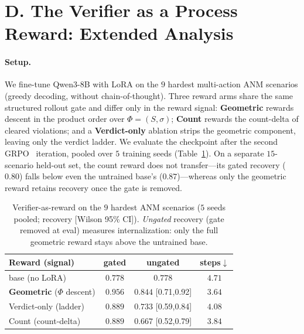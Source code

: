 \documentclass[letterpaper]{article} %
\begin{document}
\section{D. The Verifier as a Process Reward: Extended Analysis}
\label{supp:reward}

\paragraph{Setup.}
We fine-tune Qwen3-8B with LoRA on the $9$ hardest multi-action ANM scenarios (greedy decoding, without chain-of-thought). Three reward arms share the same structured rollout gate and differ only in the reward signal: \textbf{Geometric} rewards descent in the product order over $\Phi=(S,\sigma)$; \textbf{Count} rewards the count-delta of cleared violations; and a \textbf{Verdict-only} ablation strips the geometric component, leaving only the verdict ladder. We evaluate the checkpoint after the second GRPO~\citep{deepseekmath2024grpo,lightman2024prm} iteration, pooled over $5$ training seeds (Table~\ref{tab:reward}). On a separate $15$-scenario held-out set, the count reward does not transfer---its gated recovery ($0.80$) falls below even the untrained base's ($0.87$)---whereas only the geometric reward retains recovery once the gate is removed.

\begin{table}[t]
\centering
\caption{Verifier-as-reward on the $9$ hardest ANM scenarios ($5$ seeds pooled; recovery [Wilson 95\% CI]). \emph{Ungated} recovery (gate removed at eval) measures internalization: only the full geometric reward stays above the untrained base.}
\label{tab:reward}
\footnotesize
\setlength{\tabcolsep}{5pt}
\begin{tabular*}{\columnwidth}{@{\extracolsep{\fill}}lccc@{}}
\toprule
Reward (signal) & gated & \textbf{ungated} & steps$\downarrow$ \\
\midrule
base (no LoRA) & $0.778$ & $0.778$ & $4.71$ \\
\textbf{Geometric} ($\Phi$ descent) & $\mathbf{0.956}$ & $\mathbf{0.844}$ {\scriptsize[0.71,0.92]} & $\mathbf{3.64}$ \\
Verdict-only (ladder) & $0.889$ & $0.733$ {\scriptsize[0.59,0.84]} & $4.08$ \\
Count (count-delta) & $0.889$ & $0.667$ {\scriptsize[0.52,0.79]} & $3.84$ \\
\bottomrule
\end{tabular*}
\end{table}
\end{document}
